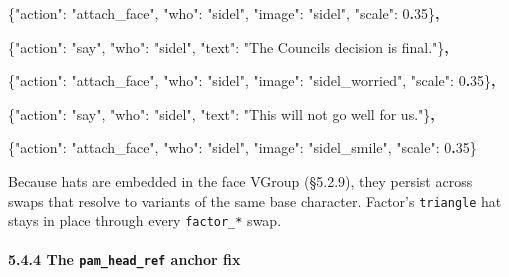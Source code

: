 \documentclass[
  12pt,
  letterpaper,
]{book}
\newenvironment{Shaded}{}{}
\newcommand{\DataTypeTok}[1]{\textcolor[rgb]{0.56,0.13,0.00}{#1}}
\newcommand{\DecValTok}[1]{\textcolor[rgb]{0.25,0.63,0.44}{#1}}
\newcommand{\ErrorTok}[1]{\textcolor[rgb]{1.00,0.00,0.00}{\textbf{#1}}}
\newcommand{\FunctionTok}[1]{\textcolor[rgb]{0.02,0.16,0.49}{#1}}
\newcommand{\StringTok}[1]{\textcolor[rgb]{0.25,0.44,0.63}{#1}}
\begin{document}
\begin{Shaded}
\begin{Highlighting}[]
\FunctionTok{\{}\DataTypeTok{"action"}\FunctionTok{:} \StringTok{"attach\_face"}\FunctionTok{,} \DataTypeTok{"who"}\FunctionTok{:} \StringTok{"sidel"}\FunctionTok{,}
 \DataTypeTok{"image"}\FunctionTok{:} \StringTok{"sidel"}\FunctionTok{,} \DataTypeTok{"scale"}\FunctionTok{:} \DecValTok{0}\ErrorTok{.}\DecValTok{35}\FunctionTok{\}}\ErrorTok{,}

\FunctionTok{\{}\DataTypeTok{"action"}\FunctionTok{:} \StringTok{"say"}\FunctionTok{,} \DataTypeTok{"who"}\FunctionTok{:} \StringTok{"sidel"}\FunctionTok{,}
 \DataTypeTok{"text"}\FunctionTok{:} \StringTok{"The Council\textquotesingle{}s decision is final."}\FunctionTok{\}}\ErrorTok{,}

\FunctionTok{\{}\DataTypeTok{"action"}\FunctionTok{:} \StringTok{"attach\_face"}\FunctionTok{,} \DataTypeTok{"who"}\FunctionTok{:} \StringTok{"sidel"}\FunctionTok{,}
 \DataTypeTok{"image"}\FunctionTok{:} \StringTok{"sidel\_worried"}\FunctionTok{,} \DataTypeTok{"scale"}\FunctionTok{:} \DecValTok{0}\ErrorTok{.}\DecValTok{35}\FunctionTok{\}}\ErrorTok{,}

\FunctionTok{\{}\DataTypeTok{"action"}\FunctionTok{:} \StringTok{"say"}\FunctionTok{,} \DataTypeTok{"who"}\FunctionTok{:} \StringTok{"sidel"}\FunctionTok{,}
 \DataTypeTok{"text"}\FunctionTok{:} \StringTok{"This will not go well for us."}\FunctionTok{\}}\ErrorTok{,}

\FunctionTok{\{}\DataTypeTok{"action"}\FunctionTok{:} \StringTok{"attach\_face"}\FunctionTok{,} \DataTypeTok{"who"}\FunctionTok{:} \StringTok{"sidel"}\FunctionTok{,}
 \DataTypeTok{"image"}\FunctionTok{:} \StringTok{"sidel\_smile"}\FunctionTok{,} \DataTypeTok{"scale"}\FunctionTok{:} \DecValTok{0}\ErrorTok{.}\DecValTok{35}\FunctionTok{\}}
\end{Highlighting}
\end{Shaded}

Because hats are embedded in the face VGroup (§5.2.9), they persist
across swaps that resolve to variants of the same base character.
Factor's \texttt{triangle} hat stays in place through every
\texttt{factor\_*} swap.

\paragraph{\texorpdfstring{5.4.4 The \texttt{pam\_head\_ref} anchor
fix}{5.4.4 The pam\_head\_ref anchor fix}}\label{the-pam_head_ref-anchor-fix}
\end{document}
